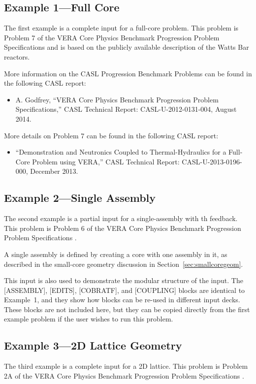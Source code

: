 \documentclass{vera-ornltm}
\begin{document}
\subsection{Example 1---Full Core}
The first example is a complete input for a full-core problem.
This problem is Problem 7 of the VERA Core Physics Benchmark Progression Problem Specifications and
is based on the publicly available description of the Watts Bar reactors.

More information on the CASL Progression Benchmark Problems can be found in the following CASL report:
\begin{itemize}
\item A. Godfrey, ``VERA Core Physics Benchmark Progression Problem Specifications,''
CASL Technical Report: CASL-U-2012-0131-004, August 2014.
\end{itemize}

More details on Problem 7 can be found in the following CASL report:
\begin{itemize}
\item ``Demonstration and Neutronics Coupled to Thermal-Hydraulics for a Full-Core Problem using VERA,''
CASL Technical Report: CASL-U-2013-0196-000, December 2013.
\end{itemize}



\subsection{Example 2---Single Assembly}
The second example is a partial input for a single-assembly with \ac{th} feedback.
This problem is Problem 6 of the VERA Core Physics Benchmark Progression Problem Specifications \cite{godfrey2014}.

A single assembly is defined by creating a core with one assembly in it,
as described in the small-core geometry discussion in Section~\ref{sec:smallcoregeom}.

This input is also used to demonstrate the modular structure of the input.  The [ASSEMBLY],  [EDITS],
[COBRATF], and [COUPLING] blocks are identical to Example~1, and they show how blocks
can be re-used in different input decks.
These blocks are not included here, but they can be copied directly from the first
example problem if the user wishes to run this problem.



\subsection{Example 3---2D Lattice Geometry}
The third example is a complete input for a 2D lattice.
This problem is Problem 2A of the VERA Core Physics Benchmark Progression Problem Specifications \cite{godfrey2014}.
\end{document}
